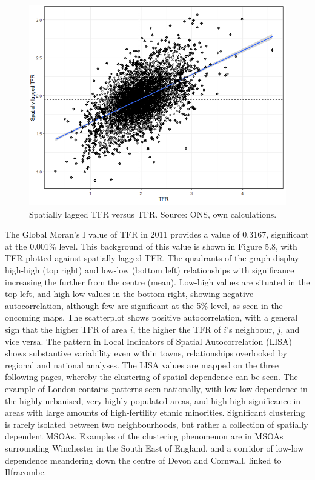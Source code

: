 \documentclass[12pt,twoside]{reedthesis}
\begin{document}
\begin{figure}
\includegraphics[width=0.95\linewidth]{figure/Figure_9} \caption{Spatially lagged TFR versus TFR. Source: ONS, own calculations.}\label{fig:figure9}
\end{figure}
The Global Moran's I value of TFR in 2011 provides a value of 0.3167, significant at the 0.001\% level. This background of this value is shown in Figure 5.8, with TFR plotted against spatially lagged TFR. The quadrants of the graph display high-high (top right) and low-low (bottom left) relationships with significance increasing the further from the centre (mean). Low-high values are situated in the top left, and high-low values in the bottom right, showing negative autocorrelation, although few are significant at the 5\% level, as seen in the oncoming maps. The scatterplot shows positive autocorrelation, with a general sign that the higher TFR of area \(i\), the higher the TFR of \(i\)'s neighbour, \(j\), and vice versa. The pattern in Local Indicators of Spatial Autocorrelation (LISA) shows substantive variability even within towns, relationships overlooked by regional and national analyses. The LISA values are mapped on the three following pages, whereby the clustering of spatial dependence can be seen. The example of London contains patterns seen nationally, with low-low dependence in the highly urbanised, very highly populated areas, and high-high significance in areas with large amounts of high-fertility ethnic minorities. Significant clustering is rarely isolated between two neighbourhoods, but rather a collection of spatially dependent MSOAs. Examples of the clustering phenomenon are in MSOAs surrounding Winchester in the South East of England, and a corridor of low-low dependence meandering down the centre of Devon and Cornwall, linked to Ilfracombe.
\end{document}
